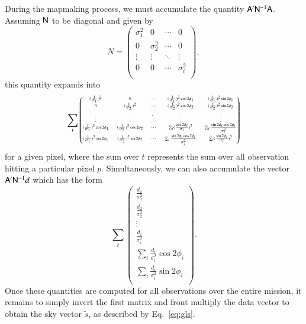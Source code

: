 \documentclass{aa}
\newcommand{\A}[0]{\tens{A}}
\newcommand{\N}[0]{\tens{N}}
\begin{document}
During the mapmaking process, we must accumulate the quantity $\A^t\N^{-1}\A$. Assuming $\N$ to be diagonal and given by
\begin{equation}
N = \begin{pmatrix}
\sigma^2_1 & 0 & \cdots & 0 \\
0 & \sigma^2_2 & \cdots & 0 \\
\vdots & \vdots & \ddots & \vdots \\
0 & 0 & \cdots & \sigma^2_i \\
\end{pmatrix},
\end{equation}
this quantity expands into
\begin{equation*}
\begin{tiny}
\sum_t
\begin{pmatrix}
(\frac{1}{\sigma_1})^2 & 0 & \cdots &
(\frac{1}{\sigma_1})^2 \cos2\phi_1 & (\frac{1}{\sigma_1})^2 \sin2\phi_1 \\

0 & (\frac{1}{\sigma_2})^2 & \cdots &
(\frac{1}{\sigma_2})^2 \cos2\phi_2 & (\frac{1}{\sigma_2})^2 \sin2\phi_2 \\

\vdots & \vdots & \ddots & \vdots & \vdots \\

(\frac{1}{\sigma_1})^2 \cos2\phi_1 & (\frac{1}{\sigma_2})^2 \cos2\phi_2 & \cdots & 
\sum_{i} (\frac{\cos 2\phi_i}{\sigma_i})^2 & \sum_{i} \frac{\sin2\phi_t \cos2\phi_i}{\sigma_i^2}  \\

(\frac{1}{\sigma_1})^2 \sin2\phi_1 & (\frac{1}{\sigma_2})^2 \sin2\phi_2 & \cdots &
\sum_{i} \frac{\sin2\phi_i \cos2\phi_i}{\sigma_i^2}  & \sum_{i} (\frac{ \sin 2\phi_i}{\sigma_i})^2
\\
\end{pmatrix}
\end{tiny}
\end{equation*}
for a given pixel, where the sum over $t$ represents the sum over all observation hitting a particular pixel $p$. Simultaneously, we can also accumulate the vector $\A^t\N^{-1}d$ which has the form
\begin{equation}
\sum_t
\begin{pmatrix}
\frac{d_{1}}{\sigma_1^2} \\
\frac{d_{2}}{\sigma_2^2}\\
\vdots\\
\frac{d_{i}}{\sigma_i^2}\\
\sum_i \frac{d_{i}}{\sigma_i^2} \cos2\phi_i\\
\sum_i \frac{d_{i}}{\sigma_i^2} \sin2\phi_i\\
\end{pmatrix}.
\end{equation}
Once these quantities are computed for all observations over the entire mission, it remains to simply invert the first matrix and front multiply the data vector to obtain the sky vector $\tilde{s}$, as described by Eq.~\ref{eq:gls}.
\end{document}
